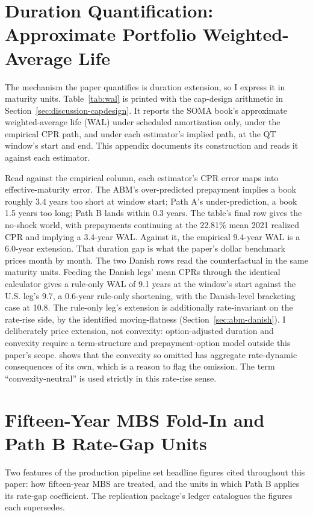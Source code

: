 \documentclass[12pt]{article}
\begin{document}
\section{Duration Quantification: Approximate Portfolio Weighted-Average Life}\label{sec:robustness-wal}

The mechanism the paper quantifies is duration extension, so I express it in maturity units. Table~\ref{tab:wal} is printed with the cap-design arithmetic in Section~\ref{sec:discussion-capdesign}. It reports the SOMA book's approximate weighted-average life (WAL) under scheduled amortization only, under the empirical CPR path, and under each estimator's implied path, at the QT window's start and end. This appendix documents its construction and reads it against each estimator.

Read against the empirical column, each estimator's CPR error maps into effective-maturity error. The ABM's over-predicted prepayment implies a book roughly 3.4 years too short at window start; Path A's under-prediction, a book 1.5 years too long; Path B lands within 0.3 years. The table's final row gives the no-shock world, with prepayments continuing at the 22.81\% mean 2021 realized CPR and implying a 3.4-year WAL. Against it, the empirical 9.4-year WAL is a 6.0-year extension. That duration gap is what the paper's dollar benchmark prices month by month. The two Danish rows read the counterfactual in the same maturity units. Feeding the Danish legs' mean CPRs through the identical calculator gives a rule-only WAL of 9.1 years at the window's start against the U.S. leg's 9.7, a 0.6-year rule-only shortening, with the Danish-level bracketing case at 10.8. The rule-only leg's extension is additionally rate-invariant on the rate-rise side, by the identified moving-flatness (Section~\ref{sec:abm-danish}). I deliberately price extension, not convexity: option-adjusted duration and convexity require a term-structure and prepayment-option model outside this paper's scope. \citet{hanson2014} shows that the convexity so omitted has aggregate rate-dynamic consequences of its own, which is a reason to flag the omission. The term ``convexity-neutral'' is used strictly in this rate-rise sense.

\section{Fifteen-Year MBS Fold-In and Path B Rate-Gap Units}\label{sec:robustness-pipeline}

Two features of the production pipeline set headline figures cited throughout this paper: how fifteen-year MBS are treated, and the units in which Path B applies its rate-gap coefficient. The replication package's ledger catalogues the figures each supersedes.
\end{document}
